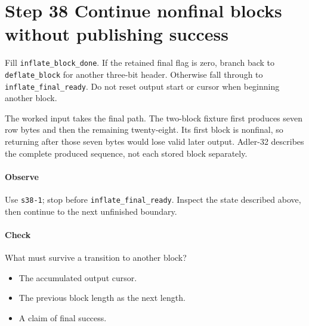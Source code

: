 \section{Step 38 Continue nonfinal blocks without publishing success}\label{png-inflate-s38}
Fill \texttt{inflate\_block\_done}. If the retained final flag is zero, branch back to \texttt{deflate\_block} for another three-bit header. Otherwise fall through to \texttt{inflate\_final\_ready}. Do not reset output start or cursor when beginning another block.

The worked input takes the final path. The two-block fixture first produces seven row bytes and then the remaining twenty-eight. Its first block is nonfinal, so returning after those seven bytes would lose valid later output. Adler-32 describes the complete produced sequence, not each stored block separately.

\paragraph{Observe} Use \texttt{s38-1}; stop before \texttt{inflate\_final\_ready}. Inspect the state described above, then continue to the next unfinished boundary.

\paragraph{Check} What must survive a transition to another block?
\begin{itemize}
  \item[A.] The accumulated output cursor.
  \item[B.] The previous block length as the next length.
  \item[C.] A claim of final success.
\end{itemize}
